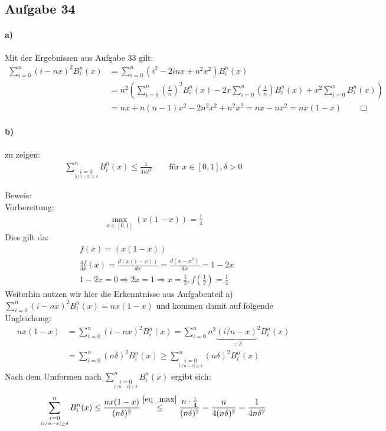 \subsection*{Aufgabe 34}

\paragraph*{a)}
Mit der Ergebnissen aus Aufgabe 33 gilt:
\begin{align*}
  \sum_{i = 0}^n (i - n x)^2 B_i^n(x) &= \sum_{i = 0}^n (i^2 - 2 i n x + n^2x^2) B_i^n(x) \\
  & = n^2 \left(\sum_{i = 0}^n \left(\frac{i}{n}\right)^2   B_i^n(x) -
    2 x \sum_{i = 0}^n \left(\frac{i}{n}\right) B_i^n(x) + x^2 \sum_{i = 0}^n B_i^n(x) \right) \\
  & =  n x + n(n-1) x^2 - 2 n^2 x^2 + n^2 x^2 = n x - n x^2 = n x (1 - x) \qquad \Box
\end{align*}

\paragraph*{b)}
zu zeigen:\begin{align*}
\sum_{\underset{|i/n-x|\ge \delta}{i=0}}^n B_i^n(x) \le \frac{1}{4n\delta^2} \qquad \text{für } x \in[0,1], \delta >0
\end{align*}

Beweis:\\\newline
Vorbereitung:
\begin{align}\label{eq_max}
\max_{x\in[0,1]}(x(1-x))=\frac{1}{4}
\end{align}
Dies gilt da: \begin{align*}
&f(x)=(x(1-x))\\
&\frac{df}{dx}(x)=\frac{d(x(1-x))}{dx}=\frac{d(x-x^2)}{dx}=1-2x\\
&1-2x=0 \Rightarrow 2x=1 \Rightarrow x=\frac{1}{2}, f\left(\frac{1}{2}\right)=\frac{1}{4}
\end{align*}
Weiterhin nutzen wir hier die Erkenntnisse aus Aufgabenteil a)
$ \sum_{i = 0}^n (i - n x)^2 B_i^n(x)  = nx (1-x)$ und kommen damit auf folgende Ungleichung:
\begin{align}
nx (1-x) &=\sum_{i = 0}^n (i - n x)^2 B_i^n(x) %
=\sum_{i = 0}^n n^2 {\underbrace{(i/n - x )}_{= \delta}}^2 B_i^n(x) \\
&= \sum_{i=0}^n (n\delta)^2 B_i^n(x)
\ge \sum_{\underset{|i/n-x|\ge \delta}{i=0}}^n (n\delta)^2 B_i^n(x)
\end{align}
Nach dem Umformen nach $\sum_{\underset{|i/n-x|\ge \delta}{i=0}}^n B_i^n(x)$ ergibt sich:
\begin{align}
\label{eq-delta}
\sum_{\underset{|i/n-x|\ge \delta}{i=0}}^n B_i^n(x) \le
\frac{nx(1-x)}{(n\delta)^2}\overset{\eqref{eq_max}}{\le}
\frac{n\cdot\frac{1}{4}}{(n\delta)^2}=\frac{n}{4(n\delta)^2}=\frac{1}{4n\delta^2}
\end{align}

